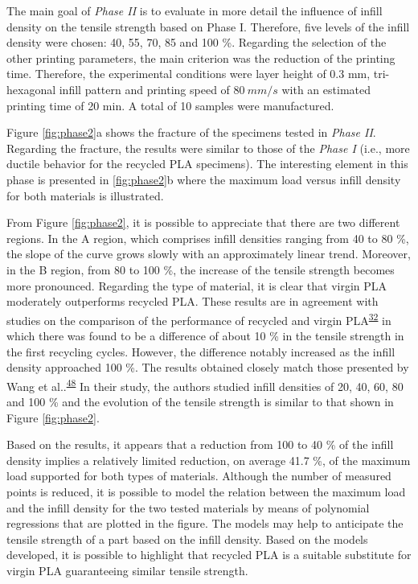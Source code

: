 \documentclass[
  12pt]{article}
\begin{document}
The main goal of \emph{Phase II} is to evaluate in more detail the influence of infill density on the tensile strength based on Phase I.
Therefore, five levels of the infill density were chosen: 40, 55, 70, 85 and 100 \%. Regarding the selection of the other printing parameters, the main criterion was the reduction of the printing time.
Therefore, the experimental conditions were layer height of 0.3 mm, tri-hexagonal infill pattern and printing speed of \(80~mm/s\) with an estimated printing time of 20 min.
A total of 10 samples were manufactured.

Figure \ref{fig:phase2}a shows the fracture of the specimens tested in \emph{Phase II}. Regarding the fracture, the results were similar to those of the \emph{Phase I} (i.e., more ductile behavior for the recycled PLA specimens).
The interesting element in this phase is presented in \ref{fig:phase2}b where the maximum load versus infill density for both materials is illustrated.

From Figure \ref{fig:phase2}, it is possible to appreciate that there are two different regions.
In the A region, which comprises infill densities ranging from 40 to 80 \%, the slope of the curve grows slowly with an approximately linear trend.
Moreover, in the B region, from 80 to 100 \%, the increase of the tensile strength becomes more pronounced.
Regarding the type of material, it is clear that virgin PLA moderately outperforms recycled PLA.
These results are in agreement with studies on the comparison of the performance of recycled and virgin PLA\textsuperscript{\protect\hyperlink{ref-CruzSanchez2017}{32}} in which there was found to be a difference of about 10 \% in the tensile strength in the first recycling cycles.
However, the difference notably increased as the infill density approached 100 \%. The results obtained closely match those presented by Wang et al..\textsuperscript{\protect\hyperlink{ref-Wang2020h}{48}}
In their study, the authors studied infill densities of 20, 40, 60, 80 and 100 \% and the evolution of the tensile strength is similar to that shown in Figure \ref{fig:phase2}.

Based on the results, it appears that a reduction from 100 to 40 \% of the infill density implies a relatively limited reduction, on average 41.7 \%, of the maximum load supported for both types of materials.
Although the number of measured points is reduced, it is possible to model the relation between the maximum load and the infill density for the two tested materials by means of polynomial regressions that are plotted in the figure.
The models may help to anticipate the tensile strength of a part based on the infill density.
Based on the models developed, it is possible to highlight that recycled PLA is a suitable substitute for virgin PLA guaranteeing similar tensile strength.
\end{document}
